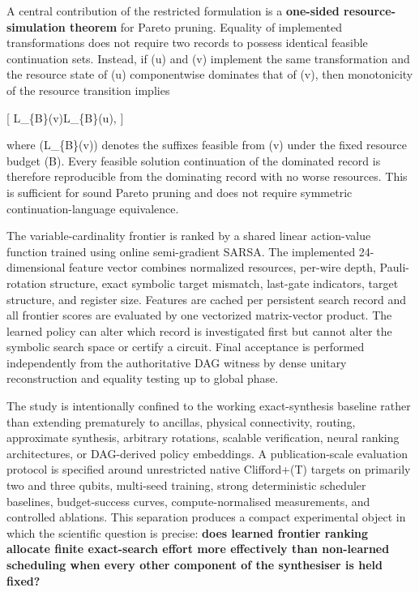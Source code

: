 \documentclass[
]{article}
\begin{document}
A central contribution of the restricted formulation is a
\textbf{one-sided resource-simulation theorem} for Pareto pruning.
Equality of implemented transformations does not require two records to
possess identical feasible continuation sets. Instead, if (u) and (v)
implement the same transformation and the resource state of (u)
componentwise dominates that of (v), then monotonicity of the resource
transition implies

{[} \mathcal L\_\{\mathbf B\}(v)\subseteq\mathcal L\_\{\mathbf B\}(u),
{]}

where (\mathcal L\_\{\mathbf B\}(v)) denotes the suffixes feasible from
(v) under the fixed resource budget (\mathbf B). Every feasible solution
continuation of the dominated record is therefore reproducible from the
dominating record with no worse resources. This is sufficient for sound
Pareto pruning and does not require symmetric continuation-language
equivalence.

The variable-cardinality frontier is ranked by a shared linear
action-value function trained using online semi-gradient SARSA. The
implemented 24-dimensional feature vector combines normalized resources,
per-wire depth, Pauli-rotation structure, exact symbolic target
mismatch, last-gate indicators, target structure, and register size.
Features are cached per persistent search record and all frontier scores
are evaluated by one vectorized matrix-vector product. The learned
policy can alter which record is investigated first but cannot alter the
symbolic search space or certify a circuit. Final acceptance is
performed independently from the authoritative DAG witness by dense
unitary reconstruction and equality testing up to global phase.

The study is intentionally confined to the working exact-synthesis
baseline rather than extending prematurely to ancillas, physical
connectivity, routing, approximate synthesis, arbitrary rotations,
scalable verification, neural ranking architectures, or DAG-derived
policy embeddings. A publication-scale evaluation protocol is specified
around unrestricted native Clifford+(T) targets on primarily two and
three qubits, multi-seed training, strong deterministic scheduler
baselines, budget-success curves, compute-normalised measurements, and
controlled ablations. This separation produces a compact experimental
object in which the scientific question is precise: \textbf{does learned
frontier ranking allocate finite exact-search effort more effectively
than non-learned scheduling when every other component of the
synthesiser is held fixed?}
\end{document}
